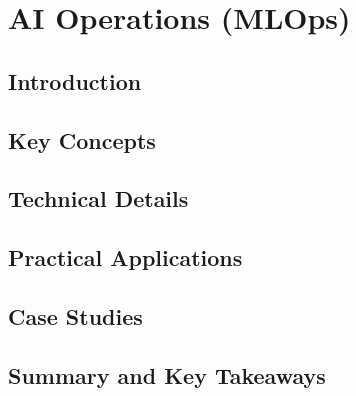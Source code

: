 ﻿%

\chapter{AI Operations (MLOps)}
\label{ch:chapter-16}

\section{Introduction}


\section{Key Concepts}


\section{Technical Details}


\section{Practical Applications}


\section{Case Studies}


\section{Summary and Key Takeaways}


